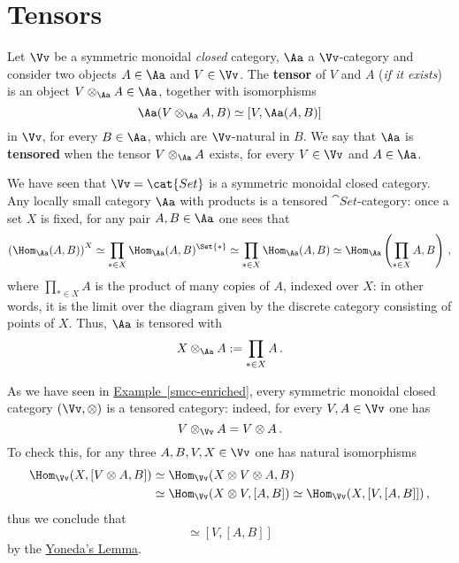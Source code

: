 
\section{Tensors}

\begin{df}
    Let $\Vv$ be a symmetric monoidal \emph{closed} category,
    $\Aa$ a $\Vv$-category and consider two objects
    $A \in \Aa$ and $V \in \Vv$.
    The \textbf{tensor} of $V$ and $A$ (\emph{if it exists})
    is an object $V \otimes_{\Aa} A \in \Aa$, 
    together with isomorphisms
    \begin{equation*}
        \Aa(V \otimes_{\Aa} A,B) \simeq [V,\Aa(A,B)]
    \end{equation*}
    in $\Vv$, for every $B \in \Aa$, which are $\Vv$-natural in $B$.
    We say that $\Aa$ is \textbf{tensored} when 
    the tensor $V \otimes_{\Aa} A$ exists, 
    for every $V \in \Vv$ and $A \in \Aa$.
\end{df}

\begin{ex}
    We have seen that $\Vv = \cat{Set}$ is a 
    symmetric monoidal closed category.
    Any locally small category $\Aa$ with products
    is a tensored $\cat{Set}$-category: once a set $X$ is fixed,
    for any pair $A,B \in \Aa$ one sees that
    \begin{equation*}
        \left( \Hom_{\Aa}(A,B) \right)^{X} 
        \simeq \prod_{\ast \in X} \Hom_{\Aa}(A,B)^{\Set{\ast}}
        \simeq \prod_{\ast \in X} \Hom_{\Aa}(A,B)
        \simeq \Hom_{\Aa}\left(\prod_{\ast \in X}A,B\right)\,,
    \end{equation*}
    where $\prod_{\ast \in X}A$ is the product of many copies of $A$,
    indexed over $X$: in other words, it is the limit over 
    the diagram given by the
    discrete category consisting of points of $X$.
    Thus, $\Aa$ is tensored with
    \begin{equation*}
        X \otimes_{\Aa} A := \prod_{\ast \in X}A\,.
    \end{equation*}
\end{ex}

\begin{ex}
    As we have seen in \hyperref[smcc-enriched]{Example~\ref*{smcc-enriched}},
    every symmetric monoidal closed category $(\Vv,\otimes)$ is a tensored category:
    indeed, for every $V,A \in \Vv$ one has
    \begin{equation*}
        V \otimes_{\Vv} A = V \otimes A\,.
    \end{equation*}
    To check this,
    for any three $A,B,V,X \in \Vv$
    one has natural isomorphisms
    \begin{align*}
        \Hom_{\Vv}(X,[V \otimes A,B])
        &\simeq \Hom_{\Vv}(X \otimes V \otimes A,B) \\
        &\simeq \Hom_{\Vv}(X \otimes V, [A,B]) %
        \simeq \Hom_{\Vv}(X, [V,[A,B]])\,,
    \end{align*}
    thus we conclude that
    \begin{equation*}
        [V \otimes A,B] \simeq [V,[A,B]]
    \end{equation*}
    by the \hyperref[yoneda]{Yoneda's Lemma}.
\end{ex}

